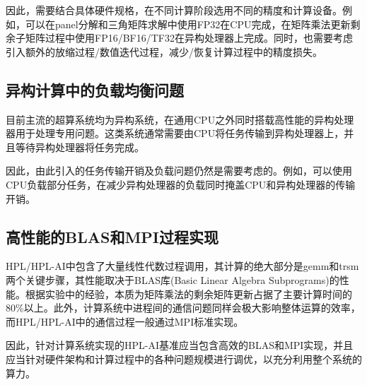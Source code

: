 因此，需要结合具体硬件规格，在不同计算阶段选用不同的精度和计算设备。例如，可以在panel分解和三角矩阵求解中使用FP32在CPU完成，在矩阵乘法更新剩余子矩阵过程中使用FP16/BF16/TF32在异构处理器上完成。同时，也需要考虑引入额外的放缩过程/数值迭代过程，减少/恢复计算过程中的精度损失。

\subsection{异构计算中的负载均衡问题}

目前主流的超算系统均为异构系统，在通用CPU之外同时搭载高性能的异构处理器用于处理专用问题。这类系统通常需要由CPU将任务传输到异构处理器上，并且等待异构处理器将任务完成。

因此，由此引入的任务传输开销及负载问题仍然是需要考虑的。例如，可以使用CPU负载部分任务，在减少异构处理器的负载同时掩盖CPU和异构处理器的传输开销。

\subsection{高性能的BLAS和MPI过程实现}

HPL/HPL-AI中包含了大量线性代数过程调用，其计算的绝大部分是gemm和trsm两个关键步骤，其性能取决于BLAS库(Basic Linear Algebra Subprograms)的性能\cite{endo2010linpack}。根据实验中的经验，本质为矩阵乘法的剩余矩阵更新占据了主要计算时间的80\%以上。此外，计算系统中进程间的通信问题同样会极大影响整体运算的效率，而HPL/HPL-AI中的通信过程一般通过MPI标准实现。

因此，针对计算系统实现的HPL-AI基准应当包含高效的BLAS和MPI实现，并且应当针对硬件架构和计算过程中的各种问题规模进行调优，以充分利用整个系统的算力。
